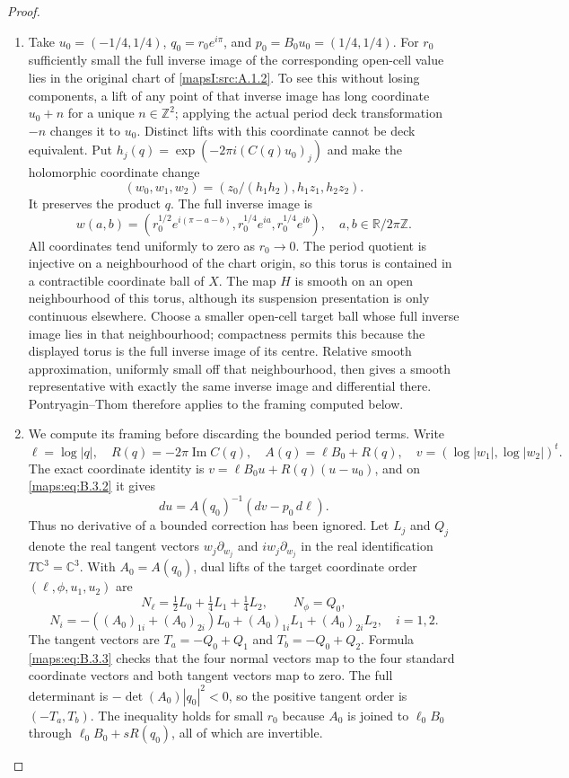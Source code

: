 \begin{proof}
\begin{enumerate}[label=\arabic*.,leftmargin=*]
\item Take $u_0=(-1/4,1/4)$, $q_0=r_0e^{i\pi}$, and
$p_0=B_0u_0=(1/4,1/4)$.  For $r_0$ sufficiently small
the full inverse image of the corresponding open-cell
value lies in the original chart of \cref{mapsI:src:A.1.2}.  To see this
without losing components, a lift of any point of that
inverse image has long coordinate $u_0+n$ for a unique
$n\in\mathbb Z^2$; applying the actual period deck
transformation $-n$ changes it to $u_0$.  Distinct lifts
with this coordinate cannot be deck equivalent.
Put $h_j(q)=\exp(-2\pi i(C(q)u_0)_j)$ and make the
holomorphic coordinate change
\[
 (w_0,w_1,w_2)
   =(z_0/(h_1h_2),h_1z_1,h_2z_2).
\]
It preserves the product $q$.  The full inverse image is
\[
 w(a,b)=
 (r_0^{1/2}e^{i(\pi-a-b)},
  r_0^{1/4}e^{ia},r_0^{1/4}e^{ib}),
 \quad a,b\in\mathbb R/2\pi\mathbb Z.
 \tag{B.3.2}\label{maps:eq:B.3.2}
\]
All coordinates tend uniformly to zero as $r_0\to0$.
The period quotient is injective on a neighbourhood of
the chart origin, so this torus is contained in a
contractible coordinate ball of $X$.
The map $H$ is smooth on an open neighbourhood of this
torus, although its suspension presentation is only
continuous elsewhere.  Choose a smaller open-cell target
ball whose full inverse image lies in that neighbourhood;
compactness permits this because the displayed torus is
the full inverse image of its centre.  Relative smooth
approximation, uniformly small off that neighbourhood,
then gives a smooth representative with exactly the same
inverse image and differential there.  Pontryagin--Thom
therefore applies to the framing computed below.

\item We compute its framing before discarding the bounded
period terms.  Write
\[
 \ell=\log|q|,\quad
 R(q)=-2\pi\operatorname{Im}C(q),\quad
 A(q)=\ell B_0+R(q),\quad
 v=(\log|w_1|,\log|w_2|)^t.
\]
The exact coordinate identity is
$v=\ell B_0u+R(q)(u-u_0)$, and on \eqref{maps:eq:B.3.2} it gives
\[
 du=A(q_0)^{-1}(dv-p_0\,d\ell).
 \tag{B.3.3}\label{maps:eq:B.3.3}
\]
Thus no derivative of a bounded correction has been
ignored.  Let $L_j$ and $Q_j$ denote the real tangent
vectors $w_j\partial_{w_j}$ and $iw_j\partial_{w_j}$
in the real identification $T\mathbb C^3=\mathbb C^3$.
With $A_0=A(q_0)$, dual lifts of the target coordinate
order $(\ell,\phi,u_1,u_2)$ are
\[
 N_\ell=\tfrac12L_0+\tfrac14L_1+\tfrac14L_2,
 \qquad N_\phi=Q_0,
\]
\[
 N_i=-((A_0)_{1i}+(A_0)_{2i})L_0
            +(A_0)_{1i}L_1+(A_0)_{2i}L_2,
 \quad i=1,2.
 \tag{B.3.4}\label{maps:eq:B.3.4}
\]
The tangent vectors are $T_a=-Q_0+Q_1$ and
$T_b=-Q_0+Q_2$.  Formula \eqref{maps:eq:B.3.3} checks that the
four normal vectors map to the four standard coordinate
vectors and both tangent vectors map to zero.
The full determinant is
$-\det(A_0)|q_0|^2<0$, so the positive tangent order is
$(-T_a,T_b)$.  The inequality holds for small $r_0$
because $A_0$ is joined to $\ell_0B_0$ through
$\ell_0B_0+sR(q_0)$, all of which are invertible.


\end{enumerate}
\end{proof}

